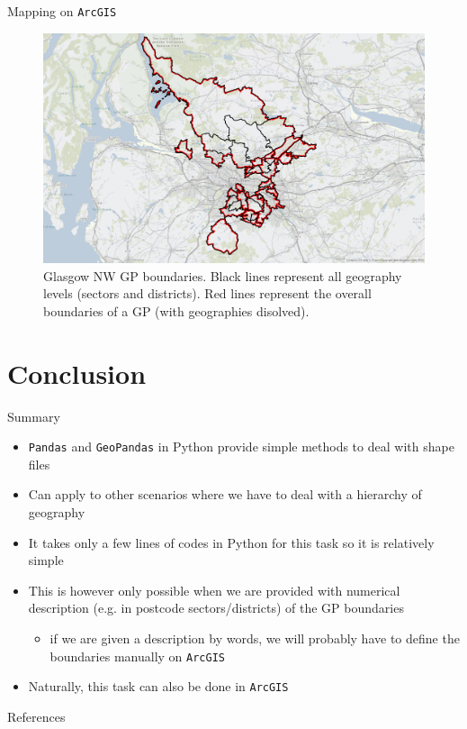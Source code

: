 \documentclass[hyperref={breaklinks,colorlinks,
   urlcolor=blue,citecolor=blue,linkcolor=red}]{beamer}
\newcommand{\Python}{{\sc Python}\xspace}
\begin{document}
\begin{frame}{Mapping on \texttt{ArcGIS}}
\begin{figure}
\begin{center}
\includegraphics[scale=0.23]{Map.pdf}
\caption{Glasgow NW GP boundaries. Black lines
represent all geography levels (sectors and districts). Red lines represent the overall boundaries of a GP (with geographies disolved).}
\end{center}
\end{figure}
\end{frame}

\section{Conclusion}
\begin{frame}{Summary}
\begin{itemize}
\item{\texttt{Pandas} and \texttt{GeoPandas} in \Python
provide simple methods to deal with shape files}
\item{Can apply to other scenarios where we have to deal with a hierarchy of geography}
\item{It takes only a few lines of codes in \Python
for this task so it is relatively simple}
\item{This is however only possible when we are provided with
numerical description (e.g. in postcode sectors/districts) of the GP boundaries}
\begin{itemize}
\item{if we are given a description by words, we will probably have to define the boundaries manually on \texttt{ArcGIS}}
\end{itemize}
\item{Naturally, this task can also be done in \texttt{ArcGIS}}
\end{itemize}

\end{frame}





\begin{frame}[allowframebreaks]{References} 

%
%

%




\end{frame}
\end{document}
